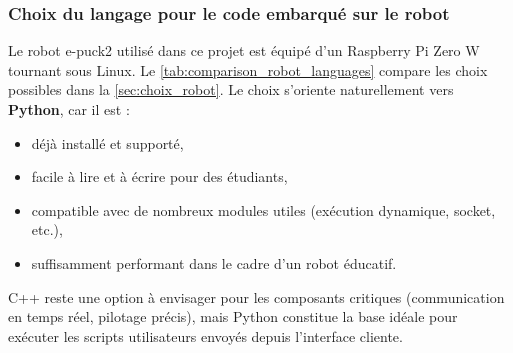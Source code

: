 \subsubsection{Choix du langage pour le code embarqué sur le robot} \label{sec:robot_code}

Le robot e-puck2 utilisé dans ce projet est équipé d’un Raspberry Pi Zero W tournant sous Linux.
Le \autoref{tab:comparison_robot_languages} compare les choix possibles dans la \autoref{sec:choix_robot}.
Le choix s’oriente naturellement vers \textbf{Python}, car il est :
\begin{itemize}
    \item déjà installé et supporté,
    \item facile à lire et à écrire pour des étudiants,
    \item compatible avec de nombreux modules utiles (exécution dynamique, socket, etc.),
    \item suffisamment performant dans le cadre d’un robot éducatif.
\end{itemize}

C++ reste une option à envisager pour les composants critiques (communication en temps réel, pilotage précis), mais Python constitue la base idéale pour exécuter les scripts utilisateurs envoyés depuis l’interface cliente.
